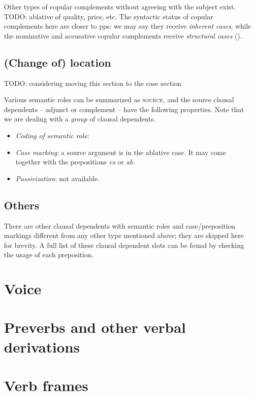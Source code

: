 \documentclass[a4paper, oneside, 12pt]{report}
\newcommand{\form}[1]{\emph{#1}}
\newcommand*{\category}[1]{\textsc{#1}}
\begin{document}
Other types of copular complements without agreeing with the subject exist.
TODO: ablative of quality, price, etc. 
The syntactic status of copular complements here are closer to \acs{pp}s:
we may say they receive \emph{inherent cases},
while the nominative and accusative copular complements 
receive \emph{structural cases} 
().

\subsection{(Change of) location}

TODO: considering moving this section to the case section

Various semantic roles can be summarized as \category{source}, 
and the source clausal dependents -- adjunct or complement -- have the following properties.
Note that we are dealing with a \emph{group} of clausal dependents.
\begin{itemize}
    \item \emph{Coding of semantic role}: 
        
    \item \emph{Case marking}: a source argument is in the ablative case.
        It may come together with the prepositions \form{ex} or \form{ab}.
    \item \emph{Passivization}: not available.
\end{itemize}

\subsection{Others}

There are other clausal dependents with semantic roles and case/preposition markings 
different from any other type mentioned above;
they are skipped here for brevity.
A full list of these clausal dependent slots can be found by checking the usage of each preposition. 

\section{Voice}\label{sec:passive}

\section{Preverbs and other verbal derivations}

\section{Verb frames}\label{sec:verb-phrase.verb-frame}
\end{document}
